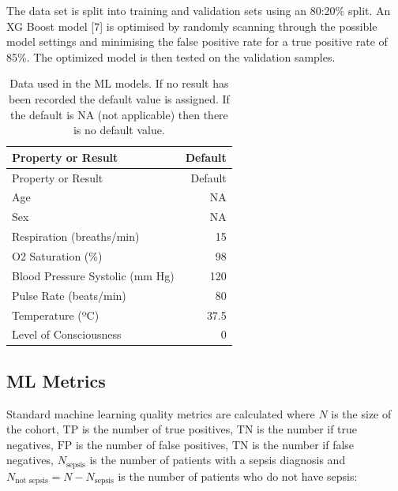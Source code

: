 \documentclass[
  a4paper,
  ,captions=tableheading
]{scrartcl}
\begin{document}
The data set is split into training and validation sets using an 80:20\%
split. An XG Boost model {[}7{]} is optimised by randomly scanning
through the possible model settings and minimising the false positive
rate for a true positive rate of 85\%. The optimized model is then
tested on the validation samples.

\begin{longtable}[]{@{}lr@{}}
\caption{\label{tbl:defaults}Data used in the ML models. If no result
has been recorded the default value is assigned. If the default is NA
(not applicable) then there is no default value.}\tabularnewline
\toprule\noalign{}
Property or Result & Default \\
\midrule\noalign{}
\endfirsthead
\toprule\noalign{}
Property or Result & Default \\
\midrule\noalign{}
\endhead
\bottomrule\noalign{}
\endlastfoot
Age & NA \\
Sex & NA \\
Respiration (breaths/min) & 15 \\
O2 Saturation (\%) & 98 \\
Blood Pressure Systolic (mm Hg) & 120 \\
Pulse Rate (beats/min) & 80 \\
Temperature (ºC) & 37.5 \\
Level of Consciousness & 0 \\
\end{longtable}

\subsection{ML Metrics}\label{ml-metrics}

Standard machine learning quality metrics are calculated where \(N\) is
the size of the cohort, \(\text{TP}\) is the number of true positives,
\(\text{TN}\) is the number if true negatives, \(\text{FP}\) is the
number of false positives, \(\text{TN}\) is the number if false
negatives, \(N_{\text{sepsis}}\) is the number of patients with a sepsis
diagnosis and \(N_{\text{not sepsis}} =
N-N_{\text{sepsis}}\) is the number of patients who do not have sepsis:
\end{document}
